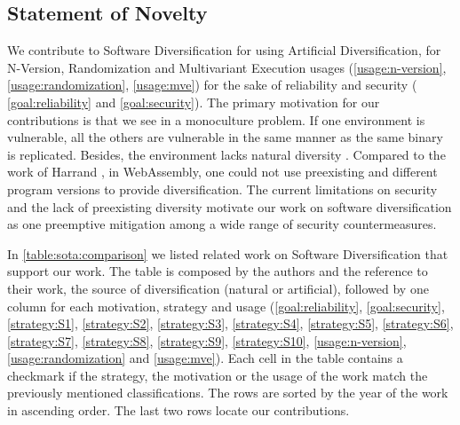 



\subsection*{Statement of Novelty}


We contribute to Software Diversification for \wasm using Artificial Diversification, for N-Version, Randomization and Multivariant Execution usages (\autoref{usage:n-version}, \autoref{usage:randomization}, \autoref{usage:mve}) for the sake of reliability and security ( \autoref{goal:reliability} and \autoref{goal:security}). 
The primary motivation for our contributions is that we see in \wasm a monoculture problem. If one environment is vulnerable, all the others are vulnerable in the same manner as the same \wasm binary is replicated. 
Besides, the \wasm environment lacks natural diversity \cite{natural_diversity}. Compared to the work of Harrand \etal \citationneeded, in WebAssembly, one could not use preexisting and different program versions to provide diversification. The current limitations on security and the lack of preexisting diversity motivate our work on software diversification as one preemptive mitigation among a wide range of security countermeasures. 


In \autoref{table:sota:comparison} we listed related work on Software Diversification that support our work. The table is composed by the authors and the reference to their work, the source of diversification (natural or artificial), followed by one column for each motivation, strategy and usage (\autoref{goal:reliability},  \autoref{goal:security},  \autoref{strategy:S1},  \autoref{strategy:S2},  \autoref{strategy:S3},  \autoref{strategy:S4},  \autoref{strategy:S5},  \autoref{strategy:S6},  \autoref{strategy:S7},  \autoref{strategy:S8},  \autoref{strategy:S9}, \autoref{strategy:S10}, \autoref{usage:n-version}, \autoref{usage:randomization} and \autoref{usage:mve}). Each cell in the table contains a checkmark if the strategy, the motivation or the usage of the work match the previously mentioned classifications. The rows are sorted by the year of the work in ascending order. The last two rows locate our contributions. 




